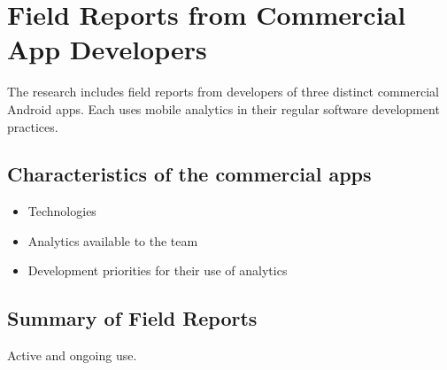 \section{Field Reports from Commercial App Developers}
The research includes field reports from developers of three distinct commercial Android apps. Each uses mobile analytics in their regular software development practices.

\subsection{Characteristics of the commercial apps}

\begin{itemize}
    \item Technologies
    \item Analytics available to the team
    \item Development priorities for their use of analytics
\end{itemize}

\subsection{Summary of Field Reports}
Active and ongoing use. 